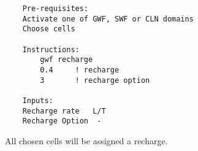     \begin{verbatim}
    Pre-requisites:
    Activate one of GWF, SWF or CLN domains
    Choose cells

    Instructions:
        gwf recharge
        0.4     ! recharge
        3       ! recharge option

    Inputs:
    Recharge rate   L/T
    Recharge Option  -
    \end{verbatim}

    All chosen cells will be assigned a recharge. 